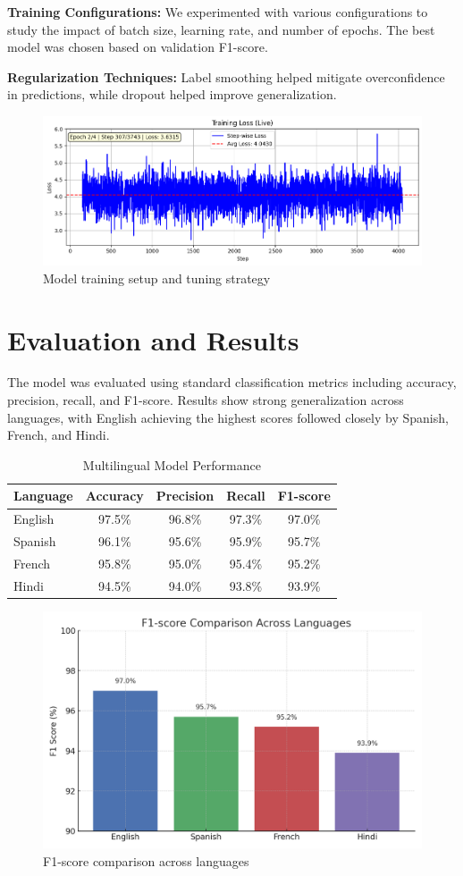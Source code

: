 \documentclass{ecai}
\begin{document}
\textbf{Training Configurations:} We experimented with various configurations to study the impact of batch size, learning rate, and number of epochs. The best model was chosen based on validation F1-score.

\textbf{Regularization Techniques:} Label smoothing helped mitigate overconfidence in predictions, while dropout helped improve generalization.

\begin{figure}[h]
\centering
\includegraphics[width=0.8\linewidth]{Tuning.png}
\caption{Model training setup and tuning strategy}
\end{figure}

\section{Evaluation and Results}
The model was evaluated using standard classification metrics including accuracy, precision, recall, and F1-score. Results show strong generalization across languages, with English achieving the highest scores followed closely by Spanish, French, and Hindi.

\begin{table}[H]
\centering
\caption{Multilingual Model Performance}
\begin{tabular}{lcccc}
\toprule
Language & Accuracy & Precision & Recall & F1-score \\
\midrule
English  & 97.5\% & 96.8\% & 97.3\% & 97.0\% \\
Spanish  & 96.1\% & 95.6\% & 95.9\% & 95.7\% \\
French   & 95.8\% & 95.0\% & 95.4\% & 95.2\% \\
Hindi    & 94.5\% & 94.0\% & 93.8\% & 93.9\% \\
\bottomrule
\end{tabular}
\end{table}

\begin{figure}[h]
\centering
\includegraphics[width=0.8\linewidth]{f1_chart.png}
\caption{F1-score comparison across languages}
\end{figure}
\end{document}
